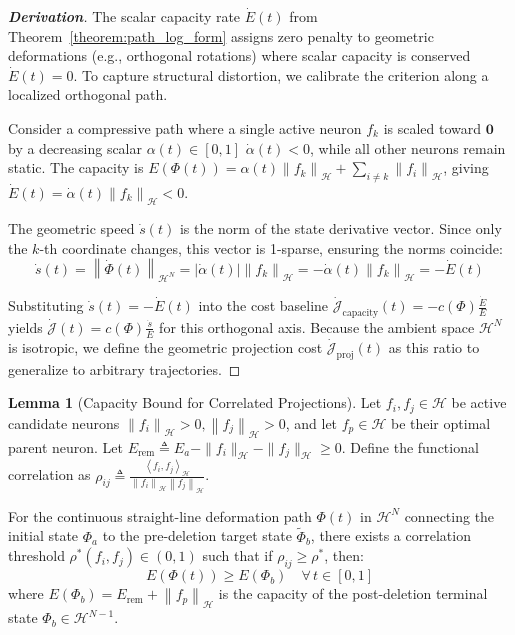 \documentclass[11pt, a4paper, copyright, gdm]{google}
\newcommand{\norm}[1]{\left\lVert#1\right\rVert}
\newcommand{\abs}[1]{\left\lvert#1\right\rvert}
\newcommand{\inner}[2]{\left\langle#1, #2\right\rangle}
\newcommand{\zeroVect}{\boldsymbol{0}}
\newcommand{\calH}{\mathcal{H}}
\newcommand{\calJ}{\mathcal{J}}
\theoremstyle{definition}
\newtheorem{lemma}[theorem]{Lemma}
\begin{document}
\begin{proof}[\textbf{Derivation}]
The scalar capacity rate $\dot{E}(t)$ from Theorem~\ref{theorem:path_log_form} assigns zero penalty to geometric deformations (e.g., orthogonal rotations) where scalar capacity is conserved $\dot{E}(t) = 0$. To capture structural distortion, we calibrate the criterion along a localized orthogonal path.

Consider a compressive path where a single active neuron $f_k$ is scaled toward $\zeroVect$ by a decreasing scalar $\alpha(t) \in [0,1]$ $\dot{\alpha}(t) < 0$, while all other neurons remain static. The capacity is $E(\Phi(t)) = \alpha(t) \norm{f_k}_{\calH} + \sum_{i \neq k} \norm{f_i}_{\calH}$, giving $\dot{E}(t) = \dot{\alpha}(t) \norm{f_k}_{\calH} < 0$.

The geometric speed $\dot{s}(t)$ is the norm of the state derivative vector. Since only the $k$-th coordinate changes, this vector is 1-sparse, ensuring the norms coincide:
\begin{equation*}
    \dot{s}(t) = \norm{\dot{\Phi}(t)}_{\calH^N} = \abs{\dot{\alpha}(t)} \norm{f_k}_{\calH} = -\dot{\alpha}(t) \norm{f_k}_{\calH} = -\dot{E}(t)
\end{equation*}

Substituting $\dot{s}(t) = -\dot{E}(t)$ into the cost baseline $\dot{\calJ}_{\text{capacity}}(t) = -c(\Phi) \frac{\dot{E}}{E}$ yields $\dot{\calJ}(t) = c(\Phi) \frac{\dot{s}}{E}$ for this orthogonal axis. Because the ambient space $\calH^N$ is isotropic, we define the geometric projection cost $\dot{\calJ}_{\text{proj}}(t)$ as this ratio to generalize to arbitrary trajectories.
\end{proof}

\begin{lemma}[Capacity Bound for Correlated Projections]
\label{lemma:discontinuity_capacity_bound}
Let $f_i, f_j \in \calH$ be active candidate neurons $\norm{f_i}_\calH > 0, \norm{f_j}_\calH > 0$, and let $f_p \in \calH$ be their optimal parent neuron. Let $E_{\text{rem}} \triangleq E_a - \|f_i\|_\calH - \|f_j\|_\calH \ge 0$. Define the functional correlation as $\rho_{ij} \triangleq \frac{\inner{f_i}{f_j}_\calH}{\norm{f_i}_\calH \norm{f_j}_\calH}$. 

For the continuous straight-line deformation path $\Phi(t)$ in $\calH^N$ connecting the initial state $\Phi_a$ to the pre-deletion target state $\tilde{\Phi}_b$, there exists a correlation threshold $\rho^*(f_i, f_j) \in (0, 1)$ such that if $\rho_{ij} \ge \rho^*$, then:
\begin{equation}
    E(\Phi(t)) \ge E(\Phi_b) \quad \forall \, t \in [0, 1]
\end{equation}
where $E(\Phi_b) = E_{\text{rem}} + \norm{f_p}_\calH$ is the capacity of the post-deletion terminal state $\Phi_b \in \calH^{N-1}$.
\end{lemma}
\end{document}
